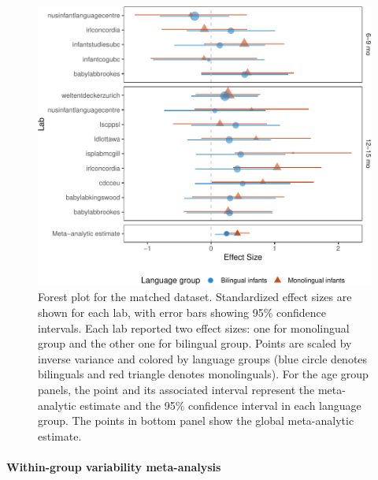 \documentclass[,man,floatsintext]{apa6}
\let\oldparagraph\paragraph
\renewcommand{\paragraph}[1]{\oldparagraph{#1}\mbox{}}
\begin{document}
\begin{figure}
\centering
\includegraphics{mb1b-paper_files/figure-latex/unnamed-chunk-3-1.pdf}
\caption{\label{fig:unnamed-chunk-3}Forest plot for the matched dataset. Standardized effect sizes are shown for each lab, with error bars showing 95\% confidence intervals. Each lab reported two effect sizes: one for monolingual group and the other one for bilingual group. Points are scaled by inverse variance and colored by language groups (blue circle denotes bilinguals and red triangle denotes monolinguals). For the age group panels, the point and its associated interval represent the meta-analytic estimate and the 95\% confidence interval in each language group. The points in bottom panel show the global meta-analytic estimate.}
\end{figure}

\hypertarget{within-group-variability-meta-analysis}{%
\paragraph{Within-group variability meta-analysis}\label{within-group-variability-meta-analysis}}
\end{document}
